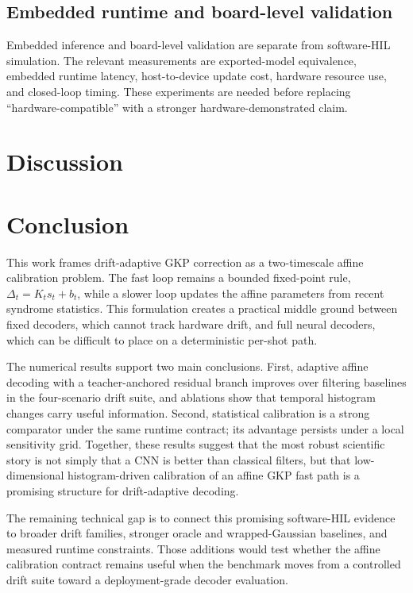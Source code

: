 \documentclass[11pt]{article}
\begin{document}
\subsection{Embedded runtime and board-level validation}

Embedded inference and board-level validation are separate from software-HIL
simulation.  The relevant measurements are exported-model equivalence, embedded
runtime latency, host-to-device update cost, hardware resource use, and
closed-loop timing.  These experiments are needed before replacing
``hardware-compatible'' with a stronger hardware-demonstrated claim.

\section{Discussion}

\section{Conclusion}

This work frames drift-adaptive GKP correction as a two-timescale affine
calibration problem.  The fast loop remains a bounded fixed-point rule,
\(\Delta_t=K_t s_t+b_t\), while a slower loop updates the affine parameters
from recent syndrome statistics.  This formulation creates a practical middle
ground between fixed decoders, which cannot track hardware drift, and full
neural decoders, which can be difficult to place on a deterministic per-shot
path.

The numerical results support two main conclusions.  First, adaptive affine
decoding with a teacher-anchored residual branch improves over filtering
baselines in the four-scenario drift suite, and ablations show that temporal
histogram changes carry useful information.  Second, statistical calibration is
a strong comparator under the same runtime contract; its advantage persists
under a local sensitivity grid.  Together, these results suggest that the most
robust scientific story is not simply that a CNN is better than classical
filters, but that low-dimensional histogram-driven calibration of an affine GKP
fast path is a promising structure for drift-adaptive decoding.

The remaining technical gap is to connect this promising software-HIL evidence
to broader drift families, stronger oracle and wrapped-Gaussian baselines, and
measured runtime constraints.  Those additions would test whether the affine
calibration contract remains useful when the benchmark moves from a controlled
drift suite toward a deployment-grade decoder evaluation.
\end{document}
